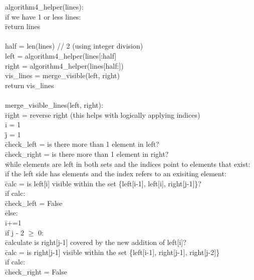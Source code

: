 \documentclass{article}
\begin{document}
\begin{tabbing}
  \> algorithm4\_helper(lines):\\
    \> \qquad \= if we have 1 or less lines: \\
      \> \qquad \qquad \= return lines \\
\> \\
    \> half = len(lines) // 2 (using integer division)\\
    \> left = algorithm4\_helper(lines[:half]\\
    \> right = algorithm4\_helper(lines[half:])\\
    \> vis\_lines = merge\_visible(left, right)\\
    \> return vis\_lines \\
\> \\
  \> merge\_visible\_lines(left, right):\\
    \> \qquad \= right = reverse right (this helps with logically applying indices)\\
    \> \qquad \= i = 1\\
    \> \qquad \= j = 1\\
    \> \qquad \= check\_left = is there more than 1 element in left?\\
    \> \qquad \= check\_right = is there more than 1 element in right?\\
    \> \qquad \= while elements are left in both sets and the indices point to elements that exist:\\
      \> \qquad \qquad \= if the left side has elements and the index refers to an exisiting element:\\
        \> \qquad \qquad\qquad \= calc = is left[i] visible within the set \{left[i-1], left[i], right[j-1]\}?\\
        \> \qquad \qquad \= if calc:\\
          \> \qquad \qquad \qquad \= check\_left = False\\
        \> \qquad \qquad \= else:\\
          \> \qquad \qquad \qquad \= i+=1\\
          \> \qquad \qquad \= if j - 2 $\geq$ 0:\\
            \> \qquad \qquad \qquad \= calculate is right[j-1] covered by the new addition of left[i]?\\
            \> \qquad \qquad \qquad \= calc = is right[j-1] visible within the set \{left[i-1], right[j-1], right[j-2]\}\\
            \> \qquad \qquad \= if calc:\\
              \> \qquad \qquad \qquad \= check\_right = False\\

\end{tabbing}
\end{document}
